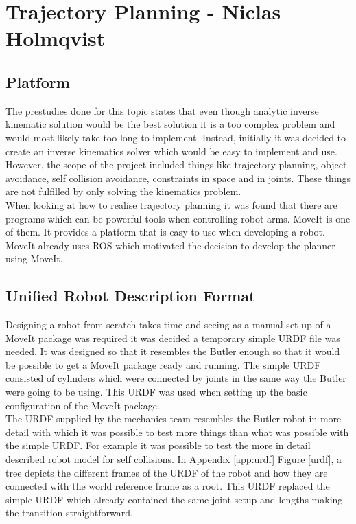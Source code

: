 \section{Trajectory Planning - Niclas Holmqvist}
\subsection{Platform}
The prestudies done for this topic states that even though analytic inverse kinematic solution would be the best solution it is a too complex problem and would most likely take too long to implement. Instead, initially it was decided to create an inverse kinematics solver which would be easy to implement and use. However, the scope of the project included things like trajectory planning, object avoidance, self collision avoidance, constraints in space and in joints. These things are not fulfilled by only solving the kinematics problem.\\
\indent When looking at how to realise trajectory planning it was found that there are programs which can be powerful tools when controlling robot arms. MoveIt is one of them. It provides a platform that is easy to use when developing a robot. MoveIt already uses ROS which motivated the decision to develop the planner using MoveIt.

\subsection{Unified Robot Description Format}
\indent Designing a robot from scratch takes time and seeing as a manual set up of a MoveIt package was required it was decided a temporary simple URDF file was needed. It was designed so that it resembles the Butler enough so that it would be possible to get a MoveIt package ready and running. The simple URDF consisted of cylinders which were connected by joints in the same way the Butler were going to be using. This URDF was used when setting up the basic configuration of the MoveIt package.\\
\indent The URDF supplied by the mechanics team resembles the Butler robot in more detail with which it was possible to test more things than what was possible with the simple URDF. For example it was possible to test the more in detail described robot model for self collisions. In Appendix \ref{app:urdf} Figure \ref{urdf}, a tree depicts the different frames of the URDF of the robot and how they are connected with the world reference frame as a root. This URDF replaced the simple URDF which already contained the same joint setup and lengths making the transition straightforward.



